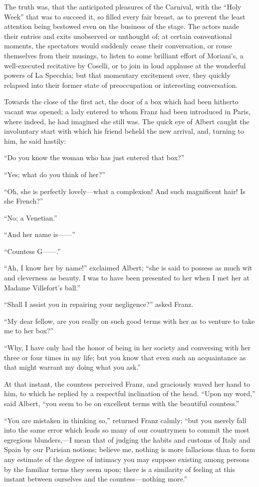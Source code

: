 The truth was, that the anticipated pleasures of the Carnival, with the
“Holy Week” that was to succeed it, so filled every fair breast, as to
prevent the least attention being bestowed even on the business of the
stage. The actors made their entries and exits unobserved or unthought
of; at certain conventional moments, the spectators would suddenly
cease their conversation, or rouse themselves from their musings, to
listen to some brilliant effort of Moriani’s, a well-executed
recitative by Coselli, or to join in loud applause at the wonderful
powers of La Specchia; but that momentary excitement over, they quickly
relapsed into their former state of preoccupation or interesting
conversation.

Towards the close of the first act, the door of a box which had been
hitherto vacant was opened; a lady entered to whom Franz had been
introduced in Paris, where indeed, he had imagined she still was. The
quick eye of Albert caught the involuntary start with which his friend
beheld the new arrival, and, turning to him, he said hastily:

“Do you know the woman who has just entered that box?”

“Yes; what do you think of her?”

“Oh, she is perfectly lovely—what a complexion! And such magnificent
hair! Is she French?”

“No; a Venetian.”

“And her name is——”

“Countess G——.”

“Ah, I know her by name!” exclaimed Albert; “she is said to possess as
much wit and cleverness as beauty. I was to have been presented to her
when I met her at Madame Villefort’s ball.”

“Shall I assist you in repairing your negligence?” asked Franz.

“My dear fellow, are you really on such good terms with her as to
venture to take me to her box?”

“Why, I have only had the honor of being in her society and conversing
with her three or four times in my life; but you know that even such an
acquaintance as that might warrant my doing what you ask.”

At that instant, the countess perceived Franz, and graciously waved her
hand to him, to which he replied by a respectful inclination of the
head. “Upon my word,” said Albert, “you seem to be on excellent terms
with the beautiful countess.”

“You are mistaken in thinking so,” returned Franz calmly; “but you
merely fall into the same error which leads so many of our countrymen
to commit the most egregious blunders,—I mean that of judging the
habits and customs of Italy and Spain by our Parisian notions; believe
me, nothing is more fallacious than to form any estimate of the degree
of intimacy you may suppose existing among persons by the familiar
terms they seem upon; there is a similarity of feeling at this instant
between ourselves and the countess—nothing more.”

